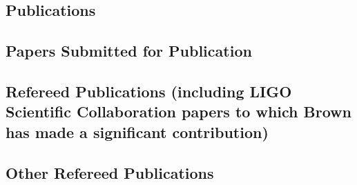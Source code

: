 \documentclass{cv}
\begin{document}
\begin{Publications}
\section{Publications}

\subsection{Papers Submitted for Publication}


\subsection{Refereed Publications (including LIGO Scientific Collaboration papers to which Brown has made a significant contribution)}


\subsection{Other Refereed Publications}


\iffalse
\subsection{Technical Reports}
\pubs[cv-cond]{tech}
\fi
\end{Publications}

\end{document}
